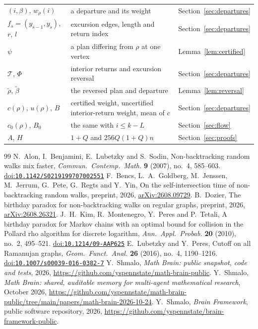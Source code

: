 \documentclass[11pt]{amsart}
\theoremstyle{remark}
\newcommand{\doi}[1]{\href{https://doi.org/#1}{doi:\nolinkurl{#1}}}
\begin{document}
\begin{center}
\begin{tabular}{lll}
$(i,\beta)$, $w_\rho(i)$ & a departure and its weight & Section~\ref{sec:departures}\\
$f_s=(y_{s-1},y_s)$, $r$, $l$ & excursion edges, length and return index & Section~\ref{sec:departures}\\
$\psi$ & a plan differing from $\rho$ at one vertex & Lemma~\ref{lem:certified}\\
$\mathcal T$, $\Phi$ & interior returns and excursion reversal & Section~\ref{sec:departures}\\
$\tilde\rho$, $\tilde\beta$ & the reversed plan and departure & Lemma~\ref{lem:reversal}\\
$c(\rho)$, $u(\rho)$, $B$ & certified weight, uncertified interior-return weight, mean of $c$ & Section~\ref{sec:departures}\\
$c_0(\rho)$, $B_0$ & the same with $i\le k-L$ & Section~\ref{sec:flow}\\
$A$, $H$ & $1+Q$ and $256Q(1+Q)n$ & Section~\ref{sec:proofs}\\
\bottomrule
\end{tabular}
\end{center}

\begin{thebibliography}{99}
 N.~Alon, I.~Benjamini, E.~Lubetzky and S.~Sodin, Non-backtracking random walks mix faster,
\emph{Commun.\ Contemp.\ Math.} \textbf{9} (2007), no.~4, 585--603. \doi{10.1142/S0219199707002551}
 F.~Bencs, L.~A.~Goldberg, M.~Jenssen, M.~Jerrum, G.~Pete, G.~Regts and Y.~Yin, On the self-intersection
time of non-backtracking random walks, preprint, 2026, \href{https://arxiv.org/abs/2608.09729}{arXiv:2608.09729}.
 B.~Dozier, The birthday paradox for non-backtracking walks on regular graphs, preprint, 2026,
\href{https://arxiv.org/abs/2608.26321}{arXiv:2608.26321}.
 J.~H.~Kim, R.~Montenegro, Y.~Peres and P.~Tetali, A birthday paradox for Markov chains with an
optimal bound for collision in the Pollard rho algorithm for discrete logarithm, \emph{Ann.\ Appl.\ Probab.}
\textbf{20} (2010), no.~2, 495--521. \doi{10.1214/09-AAP625}
 E.~Lubetzky and Y.~Peres, Cutoff on all Ramanujan graphs, \emph{Geom.\ Funct.\ Anal.}
\textbf{26} (2016), no.~4, 1190--1216. \doi{10.1007/s00039-016-0382-7}
 Y.~Shmalo, \emph{Math Brain: public snapshot, code and tests}, 2026,
\url{https://github.com/yspennstate/math-brain-public}.
 Y.~Shmalo, \emph{Math Brain: shared, auditable memory for multi-agent mathematical research},
October 2026, \url{https://github.com/yspennstate/math-brain-public/tree/main/papers/math-brain-2026-10-24}.
 Y.~Shmalo, \emph{Brain Framework}, public software repository, 2026,
\url{https://github.com/yspennstate/brain-framework-public}.
\end{thebibliography}
\end{document}
